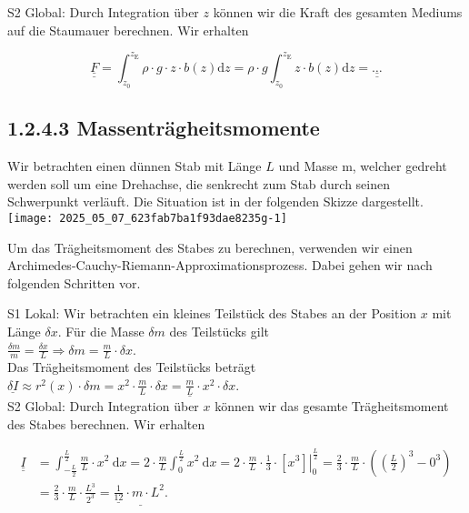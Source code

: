 \documentclass[10pt]{article}
\begin{document}
S2 Global: Durch Integration über $z$ können wir die Kraft des gesamten Mediums auf die Staumauer berechnen. Wir erhalten


\begin{equation*}
\underline{\underline{F}}=\int_{z_{0}}^{z_{\mathrm{E}}} \rho \cdot g \cdot z \cdot b(z) \mathrm{d} z=\rho \cdot g \int_{z_{0}}^{z_{\mathrm{E}}} z \cdot b(z) \mathrm{d} z=\underline{\underline{\ldots}} \tag{1.14}
\end{equation*}


\subsection*{1.2.4.3 Massenträgheitsmomente}
Wir betrachten einen dünnen Stab mit Länge $L$ und Masse m, welcher gedreht werden soll um eine Drehachse, die senkrecht zum Stab durch seinen Schwerpunkt verläuft. Die Situation ist in der folgenden Skizze dargestellt.\\
\texttt{[image: 2025\_05\_07\_623fab7ba1f93dae8235g-1]}

Um das Trägheitsmoment des Stabes zu berechnen, verwenden wir einen Archimedes-Cauchy-Riemann-Approximationsprozess. Dabei gehen wir nach folgenden Schritten vor.

S1 Lokal: Wir betrachten ein kleines Teilstück des Stabes an der Position $x$ mit Länge $\delta x$. Für die Masse $\delta m$ des Teilstücks gilt\\
$\frac{\delta m}{m}=\frac{\delta x}{L} \Rightarrow \delta m=\frac{m}{L} \cdot \delta x$.\\
Das Trägheitsmoment des Teilstücks beträgt\\
$\underline{\delta I} \approx r^{2}(x) \cdot \delta m=x^{2} \cdot \frac{m}{L} \cdot \delta x=\underline{\frac{m}{L}} \cdot x^{2} \cdot \delta x$.\\
S2 Global: Durch Integration über $x$ können wir das gesamte Trägheitsmoment des Stabes berechnen. Wir erhalten


\begin{align*}
\underline{\underline{I}} & =\int_{-\frac{L}{2}}^{\frac{L}{2}} \frac{m}{L} \cdot x^{2} \mathrm{~d} x=2 \cdot \frac{m}{L} \int_{0}^{\frac{L}{2}} x^{2} \mathrm{~d} x=\left.2 \cdot \frac{m}{L} \cdot \frac{1}{3} \cdot\left[x^{3}\right]\right|_{0} ^{\frac{L}{2}}=\frac{2}{3} \cdot \frac{m}{L} \cdot\left(\left(\frac{L}{2}\right)^{3}-0^{3}\right) \\
& =\frac{2}{3} \cdot \frac{m}{L} \cdot \frac{L^{3}}{2^{3}}=\underline{\underline{\frac{1}{12}} \cdot m \cdot L^{2} .} \tag{1.17}
\end{align*}
\end{document}
